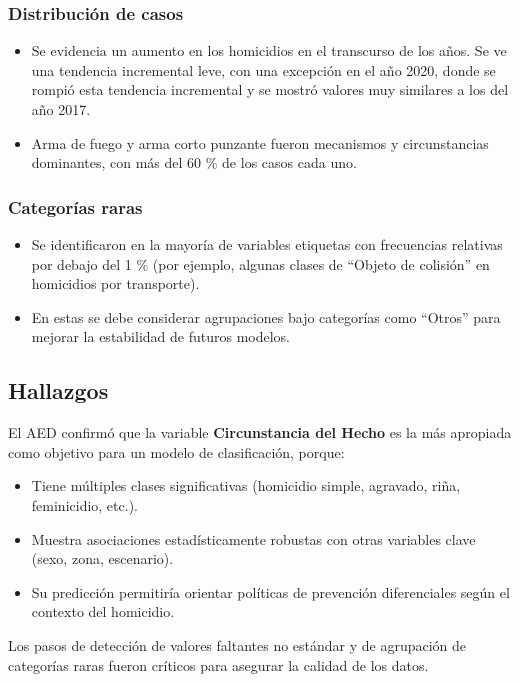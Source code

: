 \documentclass[lettersize,journal]{IEEEtran}
\begin{document}
\subsubsection{Distribución de casos}
\begin{itemize}
    \item Se evidencia un aumento en los homicidios en el transcurso de los años. Se ve una tendencia incremental leve, con una excepción en el año 2020, donde se rompió esta tendencia incremental y se mostró valores muy similares a los del año 2017.
    \item Arma de fuego y arma corto punzante fueron mecanismos y circunstancias dominantes, con más del 60 \% de los casos cada uno.
\end{itemize}

\subsubsection{Categorías raras}
\begin{itemize}
    \item Se identificaron en la mayoría de variables etiquetas con frecuencias relativas por debajo del 1 \% (por ejemplo, algunas clases de “Objeto de colisión” en homicidios por transporte).
    \item En estas se debe considerar agrupaciones bajo categorías como “Otros” para mejorar la estabilidad de futuros modelos.
\end{itemize}

\subsection{Hallazgos}

El AED confirmó que la variable \textbf{Circunstancia del Hecho} es la más apropiada como objetivo para un modelo de clasificación, porque:

\begin{itemize}
    \item Tiene múltiples clases significativas (homicidio simple, agravado, riña, feminicidio, etc.).
    \item Muestra asociaciones estadísticamente robustas con otras variables clave (sexo, zona, escenario).
    \item Su predicción permitiría orientar políticas de prevención diferenciales según el contexto del homicidio.
\end{itemize}

Los pasos de detección de valores faltantes no estándar y de agrupación de categorías raras fueron críticos para asegurar la calidad de los datos. 
\end{document}
